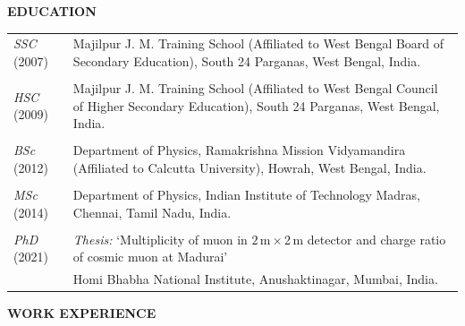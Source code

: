 \documentclass[12pt]{article}
\begin{document}
\vspace{2cm}
\colorbox{gray!40}{\begin{minipage}{17.5cm}
\bf { EDUCATION} 
\end{minipage} }

\vspace{0.4cm}
\begin{tabular}{p{3cm} p{14cm} }

  {\emph{SSC} (2007)} & Majilpur J. M. Training School (Affiliated to West Bengal Board of Secondary Education), South 24 Parganas, West Bengal, India. \\
  & \\
  {\emph{HSC} (2009)} & Majilpur J. M. Training School (Affiliated to West Bengal Council of Higher Secondary Education), South 24 Parganas, West Bengal, India. \\
  & \\
  {\emph{BSc} (2012)} & Department of Physics, Ramakrishna Mission Vidyamandira (Affiliated to Calcutta University), Howrah, West Bengal, India.\\
  & \\
  {\emph{MSc} (2014)} & Department of Physics, Indian Institute of Technology Madras, Chennai, Tamil Nadu, India.\\
  & \\
  {\emph{PhD} (2021)} &  \emph{Thesis:} `Multiplicity of muon in $2$\,m\,$\times$\,2\,m detector and charge ratio of cosmic muon at Madurai'\\
  \vspace{0.2cm}
  & Homi Bhabha National Institute, Anushaktinagar, Mumbai, India.%

\end{tabular}

\pagebreak
\vspace{0.5cm}
\colorbox{gray!40}{\begin{minipage}{17.5cm}
\bf {WORK EXPERIENCE } 
\end{minipage} }
\end{document}
